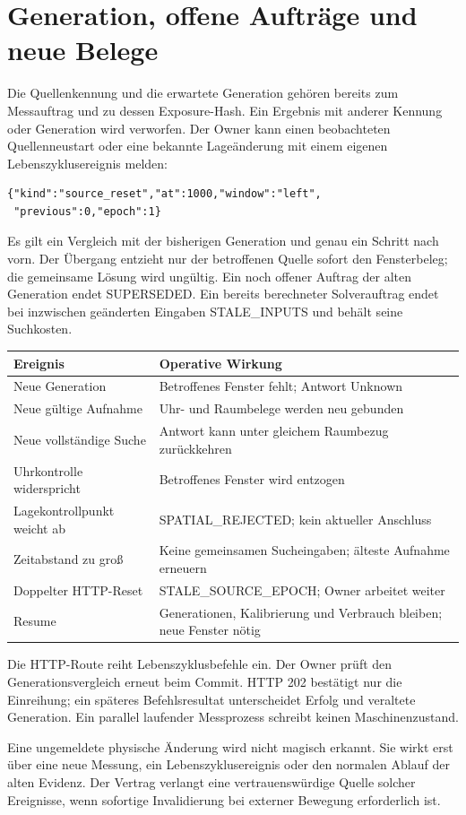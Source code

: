 \documentclass[11pt,a4paper]{article}
\newcommand{\nextsection}[2]{\clearpage{\color{accent}\small\textsf{#1}}\section{#2}}
\begin{document}
\nextsection{80 / QUELLENLEBENSZYKLUS}{Generation, offene Aufträge und neue Belege}
Die Quellenkennung und die erwartete Generation gehören bereits
zum Messauftrag und zu dessen Exposure-Hash. Ein Ergebnis mit
anderer Kennung oder Generation wird verworfen. Der Owner kann
einen beobachteten Quellenneustart oder eine bekannte Lageänderung
mit einem eigenen Lebenszyklusereignis melden:
\begin{lstlisting}
{"kind":"source_reset","at":1000,"window":"left",
 "previous":0,"epoch":1}
\end{lstlisting}
Es gilt ein Vergleich mit der bisherigen Generation und genau ein
Schritt nach vorn. Der Übergang entzieht nur der betroffenen Quelle
sofort den Fensterbeleg; die gemeinsame Lösung wird ungültig.
Ein noch offener Auftrag der alten Generation endet SUPERSEDED.
Ein bereits berechneter Solverauftrag endet bei inzwischen
geänderten Eingaben STALE\_INPUTS und behält seine Suchkosten.

\begin{tabularx}{\linewidth}{@{}lY@{}}\toprule
Ereignis & Operative Wirkung\\\midrule
Neue Generation & Betroffenes Fenster fehlt; Antwort Unknown\\
Neue gültige Aufnahme & Uhr- und Raumbelege werden neu gebunden\\
Neue vollständige Suche & Antwort kann unter gleichem Raumbezug zurückkehren\\
Uhrkontrolle widerspricht & Betroffenes Fenster wird entzogen\\
Lagekontrollpunkt weicht ab & SPATIAL\_REJECTED; kein aktueller Anschluss\\
Zeitabstand zu groß & Keine gemeinsamen Sucheingaben; älteste Aufnahme erneuern\\
Doppelter HTTP-Reset & STALE\_SOURCE\_EPOCH; Owner arbeitet weiter\\
Resume & Generationen, Kalibrierung und Verbrauch bleiben; neue Fenster nötig\\\bottomrule
\end{tabularx}

Die HTTP-Route reiht Lebenszyklusbefehle ein. Der Owner prüft den
Generationsvergleich erneut beim Commit. HTTP 202 bestätigt nur
die Einreihung; ein späteres Befehlsresultat unterscheidet Erfolg
und veraltete Generation. Ein parallel laufender Messprozess
schreibt keinen Maschinenzustand.

Eine ungemeldete physische Änderung wird nicht magisch erkannt.
Sie wirkt erst über eine neue Messung, ein Lebenszyklusereignis
oder den normalen Ablauf der alten Evidenz. Der Vertrag verlangt
eine vertrauenswürdige Quelle solcher Ereignisse, wenn sofortige
Invalidierung bei externer Bewegung erforderlich ist.
\end{document}
